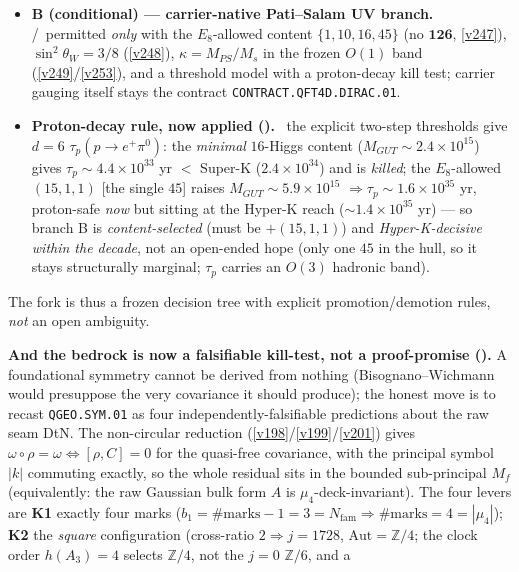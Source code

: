 \documentclass[11pt,a4paper]{article}
\newcommand{\Z}{\mathbb Z}
\begin{document}
\begin{keybox}
\begin{keybox}
\begin{itemize}
\item \textbf{B (conditional) --- carrier-native Pati--Salam UV branch.} \mC/\mO\ permitted \emph{only}
  with the $E_8$-allowed content $\{1,10,16,45\}$ (no $\mathbf{126}$, \vref{v247}), $\sin^2\theta_W{=}3/8$
  (\vref{v248}), $\kappa{=}M_{PS}/M_s$ in the frozen $O(1)$ band (\vref{v249}/\vref{v253}), and a threshold
  model with a proton-decay kill test; carrier gauging itself stays the contract \texttt{CONTRACT.QFT4D.DIRAC.01}.
\item \textbf{Proton-decay rule, now applied ().} \mX\ the explicit
  two-step thresholds give $d{=}6$ $\tau_p(p{\to}e^+\pi^0)$: the \emph{minimal} $16$-Higgs content
  ($M_{GUT}{\sim}2.4{\times}10^{15}$) gives $\tau_p{\sim}4.4{\times}10^{33}$ yr $<$ Super-K
  ($2.4{\times}10^{34}$) and is \emph{killed}; the $E_8$-allowed $(15,1,1)$ [the single $45$] raises
  $M_{GUT}{\sim}5.9{\times}10^{15}$ $\Rightarrow\tau_p{\sim}1.6{\times}10^{35}$ yr, proton-safe \emph{now}
  but sitting at the Hyper-K reach (${\sim}1.4{\times}10^{35}$ yr) --- so branch B is \emph{content-selected}
  (must be $+(15,1,1)$) and \emph{Hyper-K-decisive within the decade}, not an open-ended hope (only one $45$
  in the hull, so it stays structurally marginal; $\tau_p$ carries an $O(3)$ hadronic band).
\end{itemize}
The fork is thus a frozen decision tree with explicit promotion/demotion rules, \emph{not} an open ambiguity.
\end{keybox}
\par\smallskip\noindent\textbf{And the bedrock is now a falsifiable kill-test, not a proof-promise
().} A foundational symmetry cannot be derived from nothing
(Bisognano--Wichmann would presuppose the very covariance it should produce); the honest move is to recast
\texttt{QGEO.SYM.01} as four independently-falsifiable predictions about the raw seam DtN. The non-circular
reduction (\vref{v198}/\vref{v199}/\vref{v201}) gives $\omega{\circ}\rho{=}\omega\Leftrightarrow[\rho,C]{=}0$
for the quasi-free covariance, with the principal symbol $|k|$ commuting exactly, so the whole residual sits
in the bounded sub-principal $M_f$ (equivalently: the raw Gaussian bulk form $A$ is $\mu_4$-deck-invariant).
The four levers are \textbf{K1} exactly four marks ($b_1{=}\#\text{marks}{-}1{=}3{=}N_{\mathrm{fam}}\Rightarrow
\#\text{marks}{=}4{=}|\mu_4|$); \textbf{K2} the \emph{square} configuration (cross-ratio $2\Rightarrow
j{=}1728$, $\mathrm{Aut}{=}\Z/4$; the clock order $h(A_3){=}4$ selects $\Z/4$, not the $j{=}0$ $\Z/6$, and a

\end{keybox}
\end{document}
